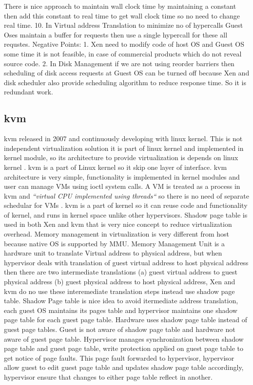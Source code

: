 \documentclass[seminar,twoside]{iitbreport}
\begin{document}
There is nice approach to maintain wall clock time 
by maintaining a constant then add this constant to real time to get wall clock time 
so no need to change real time.
10. In Virtual address Translation to minimize no of hypercalls Guest Oses maintain a buffer for requests 
then use a single hypercall for these all requstes.
Negative Points: 1. Xen need to modify code of host OS and Guest OS some time it is not feasible, in case of commercial products
which do not reveal source code.
2. In Disk Management if we are not using reorder barriers then scheduling of disk access requests 
at Guest OS can be turned off because Xen and disk scheduler also provide 
scheduling algorithm to reduce response time. So it is redundant work.

\subsection{kvm} kvm released in 2007 and continuously developing with linux kernel.
This is not independent virtualization solution it is part of linux kernel and implemented in kernel module, so its architecture
to provide virtualization is depends on linux kernel .
kvm is a part of Linux kernel so it skip one layer of interface. kvm architecture is very simple,
functionality is implemented in kernel modules and user can manage VMs using ioctl system calls.
A VM is treated as a process in kvm and \emph{``virtual CPU implemented using threads``}\cite{xenkvm2014} so there is no need of separate
schedular for VMs .
kvm is a part of kernel so it can reuse code and functionality of kernel, and runs in kernel space unlike other hypervisors.
Shadow page table is used in both Xen and kvm that is very nice concept to reduce virtualization overhead.
Memory management in virtualization is very different from host because native OS is supported by MMU. Memory Management Unit 
is a hardware unit to translate Virtual address to physical address, but when hypervisor deals with translation of guest virtual
address to host physical address then there are two intermediate translations (a) guest virtual address to guest physical address 
(b) guest physical address to host physical address, Xen and kvm do no use these interemediate translation steps instead use shadow page table.
Shadow Page table is nice idea to avoid itermediate address translation, each guest OS maintains its pages table and hypervisor 
maintains one shadow page table for each guest page table. Hardware uses shadow page table instead of guest page tables.
Guest is not aware of shadow page table and hardware not aware of guest page table. Hypervisor manages synchronization between shadow
page table and guest page table,  write protection applied on guest page table to get notice of page faults. This page fault forwarded to 
hypervisor, hypervisor allow guest to edit guest page table and updates shadow page table accordingly, hypervisor ensure that changes to either page table reflect in another.  
\end{document}
